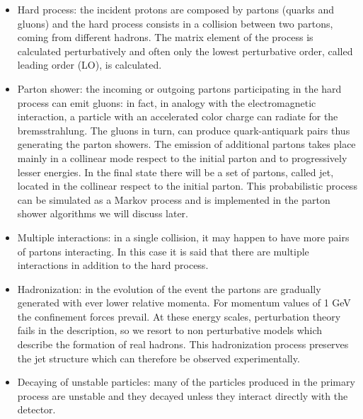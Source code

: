 \begin{itemize}

\item Hard process: the incident protons are composed by  partons (quarks and gluons) and the hard process consists in a collision between two partons, coming from different hadrons. The  matrix element of the process is calculated perturbatively and often only the lowest perturbative order, called leading order (LO), is calculated.
\item Parton shower: the incoming or outgoing partons participating in the hard process can emit gluons: in fact, in analogy with the electromagnetic interaction, a particle with an accelerated color charge can radiate for the bremsstrahlung.
The gluons in turn, can produce quark-antiquark pairs thus generating the parton showers.
The emission of additional partons takes place mainly in a collinear mode respect to the initial parton and to progressively lesser energies.
In the final state there will be a set of partons, called jet, located in the collinear respect to the initial parton.
This probabilistic process can be simulated as a Markov process and is implemented in the parton shower algorithms we will discuss later.

\item Multiple interactions: in a single collision, it may happen to have more pairs of partons interacting. In this case it is said that there are multiple interactions in addition to the hard process.

\item Hadronization: in the evolution of the event the partons are gradually generated with ever lower relative momenta. 
For momentum values of 1 GeV the confinement forces prevail. At these energy scales, perturbation theory fails in the description, so we resort to non perturbative models which describe the formation of real hadrons. This hadronization process  preserves the jet structure which can therefore be observed experimentally.

\item Decaying of unstable particles: many of the particles produced in the primary process are unstable and they  decayed unless they interact directly with the detector.

\end{itemize}

